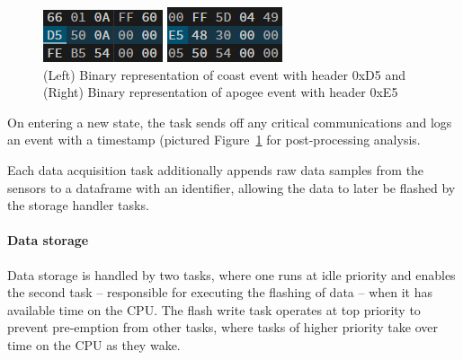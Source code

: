 \begin{figure}[h]
    \begin{center}
        \begin{minipage}{0.48\textwidth}
            \includegraphics[width=\linewidth]{./img/coast_frame.png}
        \end{minipage}\hspace{1em}%
        \begin{minipage}{0.48\textwidth}
            \includegraphics[width=0.92\linewidth]{./img/apogee_frame.png}
        \end{minipage}
    \end{center}
    \caption{(Left) Binary representation of coast event with header 0xD5 and (Right) Binary representation of apogee event with header 0xE5}\label{fig:state_dataframes}
\end{figure}

On entering a new state, the task sends off any critical communications and logs an event with a timestamp (pictured Figure~\ref{fig:state_dataframes} for post-processing analysis.

Each data acquisition task additionally appends raw data samples from the sensors to a dataframe with an identifier, allowing the data to later be flashed by the storage handler tasks.

\paragraph{Data storage}
Data storage is handled by two tasks, where one runs at idle priority and enables the second task -- responsible for executing the flashing of data -- when it has available time on the CPU. The flash write task operates at top priority to prevent pre-emption from other tasks, where tasks of higher priority take over time on the CPU as they wake. 

